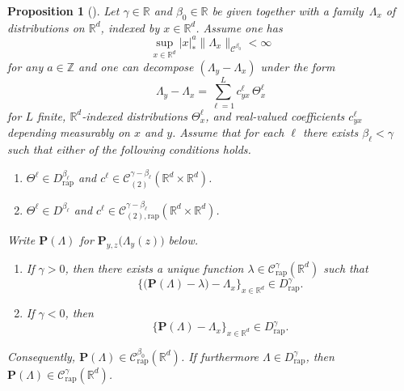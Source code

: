 \documentclass[JEP,XML,SOM,Unicode,published]{cedram}
\newenvironment{enumeratei}
{\bgroup\def\theenumi{\roman{enumi}}\def\theenumii{\arabic{enumii}}\begin{enumerate}}
{\end{enumerate}\egroup}
\newenvironment{enumeratea}
{\bgroup\def\theenumi{\alph{enumi}}\begin{enumerate}}
{\end{enumerate}\egroup}
\theoremstyle{plain}
\newtheorem{prop}[thm]{Proposition}
\theoremstyle{definition}
\newcommand{\rap}{\mathrm{rap}}
\newcommand{\bfP}{\mathbf{P}}
\newcommand{\bbR}{\mathbb{R}}
\newcommand{\bbZ}{\mathbb{Z}}
\newcommand{\mcC}{\mathcal{C}}
\begin{document}
\begin{prop}[{\cite[Prop.\,9]{BH}}] \label{prop:reconstruction}
Let $\gamma\!\in\!\bbR$ and $\beta_0\!\in\!\bbR$ be given together with a fam\-ily~$\Lambda_x$ of distributions on $\bbR^d$, indexed by $x\in\bbR^d$. Assume one has
\[
\sup_{x\in\bbR^d}|x|_*^a\|\Lambda_x\|_{\mcC^{\beta_0}}< \infty
\]
for any $a\in\bbZ$ and one can decompose $(\Lambda_y - \Lambda_x)$ under the form
\begin{equation*}
\Lambda_y - \Lambda_x = \sum_{\ell=1}^L c^\ell_{yx}\,\Theta_x^\ell
\end{equation*}
for $L$ finite, $\bbR^d$-indexed distributions $\Theta_x^\ell$, and real-valued coefficients $c_{yx}^\ell$ depending measurably on $x$ and $y$.
Assume that for each $\ell$ there exists $\beta_\ell<\gamma$ such that either of the following conditions holds.
\begin{enumeratea}
\item\label{prop:reconstructiona} $\Theta^\ell\in D_{\rap}^{\beta_\ell}$ and $c^\ell\in\mcC_{(2)}^{\gamma-\beta_\ell}(\bbR^d\times\bbR^d)$.
\item\label{prop:reconstructionb} $\Theta^\ell\in D^{\beta_\ell}$ and $c^\ell\in\mcC_{(2),\rap}^{\gamma-\beta_\ell}(\bbR^d\times\bbR^d)$.
\end{enumeratea}

\noindent Write ${\bfP}(\Lambda)$ for ${\bfP}_{y,z}\bigl(\Lambda_y(z)\bigr)$ below.

\begin{enumeratei}
\item If $\gamma>0$, then there exists a unique function $\lambda\in \mcC_{\rap}^\gamma(\bbR^d)$ such that
\[
\big\{\bigl(\bfP(\Lambda)-\lambda\bigr) - \Lambda_x\big\}_{x\in\bbR^d}\in D_\rap^\gamma.
\]
\item If $\gamma<0$, then
\[
\big\{\bfP(\Lambda)-\Lambda_x\big\}_{x\in\bbR^d}\in D_\rap^\gamma.
\]
\end{enumeratei}
Consequently, $\bfP(\Lambda)\in \mcC_\rap^{\beta_0}(\bbR^d)$. If furthermore $\Lambda\in D_\rap^\gamma$, then $\bfP(\Lambda)\in \mcC_\rap^\gamma(\bbR^d)$.
\end{prop}
\end{document}
